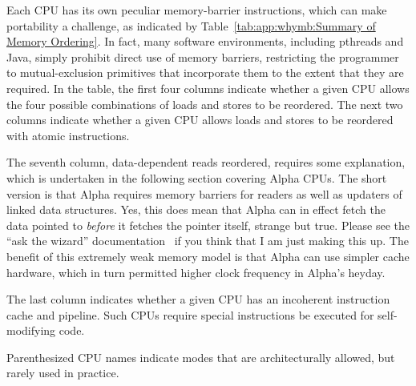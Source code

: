 Each CPU has its own peculiar memory-barrier instructions, which
can make portability a challenge, as indicated by
Table~\ref{tab:app:whymb:Summary of Memory Ordering}.
In fact, many software environments,
including pthreads and Java, simply prohibit
direct use of memory barriers, restricting the programmer to mutual-exclusion
primitives that incorporate them to the extent that they are required.
In the table,
the first four columns indicate whether a given CPU allows the four
possible combinations of loads and stores to be reordered.
The next two columns indicate whether a given CPU allows loads and stores
to be reordered with atomic instructions.

The seventh column, data-dependent reads reordered, requires some explanation,
which is undertaken in the following section covering Alpha CPUs.
The short version is that Alpha requires memory barriers for readers
as well as updaters of linked data structures.
Yes, this does mean that Alpha can in effect fetch
the data pointed to {\em before} it fetches the pointer itself, strange
but true.
Please see the ``ask the wizard'' documentation~\cite{Compaq01}
if you think that I am just making this up.
The benefit of this extremely weak memory model is that Alpha can use
simpler cache hardware, which in turn permitted higher clock frequency
in Alpha's heyday.

The last column indicates whether a given CPU has an incoherent
instruction cache and pipeline.
Such CPUs require special instructions be executed for self-modifying
code.

Parenthesized CPU names indicate modes that are architecturally allowed,
but rarely used in practice.

